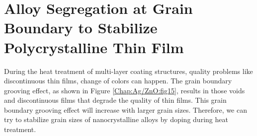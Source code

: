 \section{Alloy Segregation at Grain Boundary to Stabilize Polycrystalline Thin Film}
\label{Chap:Ag/ZnO:GB}



During the heat treatment of multi-layer coating structures, quality problems like discontinuous thin films, change of colors can happen. The grain boundary grooving effect, as shown in Figure \ref{Chap:Ag/ZnO:fig15}, results in those voids and discontinuous films that degrade the quality of thin films\cite{mullins1957theory,simrick2012thermal}. This grain boundary grooving effect will increase with larger grain sizes\cite{martin2009thermal}. Therefore, we can try to stabilize grain sizes of nanocrystalline alloys by doping during heat treatment\cite{chookajorn2012design,jiao2018nanocrystalline}.


